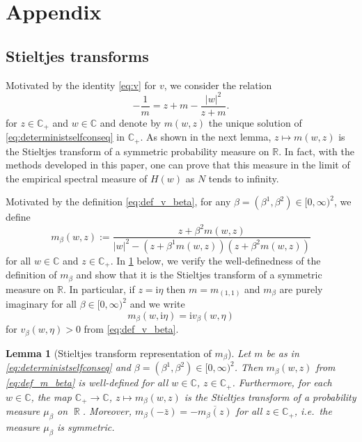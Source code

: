 \documentclass[10pt,a4paper]{amsart}
\DeclareMathOperator{\RR}{\mathbb{R}}
\newcommand{\ii}{\mathrm{i}}
\newcommand{\abs}[1]{\left| #1 \right|}
\newcommand{\R}{\mathbb{R}}
\newcommand{\C}{\mathbb{C}}
\newtheorem{lemma}{Lemma}[section]
\numberwithin{equation}{section}
\newcommand*\barr[1]{\overline{#1}}
\begin{document}
	
	\appendix 
	
	
	\section{Appendix} 
	
	\subsection{Stieltjes transforms} 

Motivated by the identity \cref{eq:v} for $v$, we consider the relation 
\begin{equation}\label{eq:deterministselfconseq}
		-\frac{1}{m}= z + m - \frac{|w|^2}{z+m}.
	\end{equation}
	for $z \in \C_+$ and $w \in \C$ and denote by $m(w,z)$ the unique solution of \cref{eq:deterministselfconseq} in $\C_+$.
	As shown in the next lemma, $z\mapsto m(w,z)$ is the Stieltjes transform of a symmetric probability measure on $\R$. In fact, with the methods developed in this paper, one can prove that this measure in the limit of the empirical spectral measure of $H(w)$ as $N$ tends to infinity.
	
	Motivated by the definition \cref{eq:def_v_beta}, for any $\beta = (\beta^1, \beta^2) \in [0,\infty)^2$, we define 
	\begin{equation} \label{eq:def_m_beta}  
		m_\beta(w,z) := \frac{z + \beta^2m(w,z)}{\abs{w}^2 - (z + \beta^1 m(w,z))(z + \beta^2 m(w,z))} 
	\end{equation} 
	for all $w \in \C$ and $z \in \C_+$. 
	In \cref{lem:m_1_Stieltjes} below, we verify the well-definedness of the definition of $m_\beta$ and show that it is the Stieltjes transform of a symmetric measure on $\R$. 
	In particular, if $z = \ii \eta$ then $m=m_{(1,1)}$ and $m_{\beta}$ are purely imaginary  for all $\beta \in [0,\infty)^2$ and we write 
	\begin{equation} \label{eq:v_beta_m_beta} 
		m_{\beta}(w,\ii\eta) = \ii v_{\beta}(w,\eta)
 	\end{equation}
	for $v_{\beta}(w,\eta)>0$ from \eqref{eq:def_v_beta}. 
	
	
	\begin{lemma}[Stieltjes transform representation of $m_\beta$]
		\label{lem:m_1_Stieltjes} 
		Let $m$ be as in \eqref{eq:deterministselfconseq} and $\beta =(\beta^1, \beta^2) \in [0,\infty)^2$. Then $m_\beta(w,z)$ from \eqref{eq:def_m_beta} is well-defined for all $w \in \C$, $z \in \C_+$. Furthermore, for each $w \in \C$, the map $\C_+ \to \C$, $z \mapsto m_\beta(w,z)$ is the Stieltjes transform of a probability measure $\mu_\beta$ on $\RR$. 
		Moreover, $m_\beta(- \bar z) = - \barr{m_\beta(z)}$ for all $z \in \C_+$, i.e.\ the measure $\mu_\beta$ is symmetric. 
	\end{lemma}
	
\end{document}
